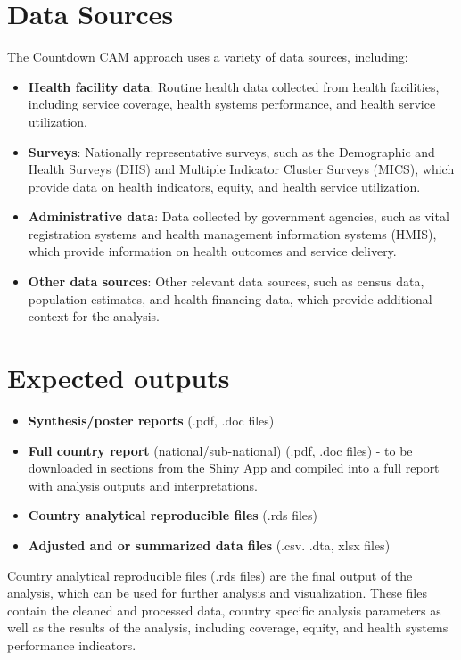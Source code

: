 \documentclass[
  english,
  letterpaper,
  DIV=11,
  numbers=noendperiod]{scrreprt}
\providecommand{\tightlist}{%
  \setlength{\itemsep}{0pt}\setlength{\parskip}{0pt}}
\begin{document}
\section{Data Sources}\label{intro-data-sources}

The Countdown CAM approach uses a variety of data sources, including:

\begin{itemize}
\tightlist
\item
  \textbf{Health facility data}: Routine health data collected from
  health facilities, including service coverage, health systems
  performance, and health service utilization.
\item
  \textbf{Surveys}: Nationally representative surveys, such as the
  Demographic and Health Surveys (DHS) and Multiple Indicator Cluster
  Surveys (MICS), which provide data on health indicators, equity, and
  health service utilization.
\item
  \textbf{Administrative data}: Data collected by government agencies,
  such as vital registration systems and health management information
  systems (HMIS), which provide information on health outcomes and
  service delivery.
\item
  \textbf{Other data sources}: Other relevant data sources, such as
  census data, population estimates, and health financing data, which
  provide additional context for the analysis.
\end{itemize}

\section{Expected outputs}\label{intro-expected-outputs}

\begin{itemize}
\tightlist
\item
  \textbf{Synthesis/poster reports} (.pdf, .doc files)
\item
  \textbf{Full country report} (national/sub-national) (.pdf, .doc
  files) - to be downloaded in sections from the Shiny App and compiled
  into a full report with analysis outputs and interpretations.
\item
  \textbf{Country analytical reproducible files} (.rds files)
\item
  \textbf{Adjusted and or summarized data files} (.csv. .dta, xlsx
  files)
\end{itemize}

Country analytical reproducible files (.rds files) are the final output
of the analysis, which can be used for further analysis and
visualization. These files contain the cleaned and processed data,
country specific analysis parameters as well as the results of the
analysis, including coverage, equity, and health systems performance
indicators.
\end{document}
